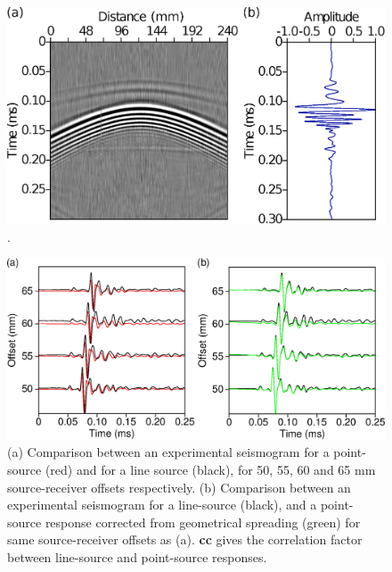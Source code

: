 \documentclass[manuscript,revised]{geophysics}
\begin{document}
\begin{figure}[!h]
	\centering
	\includegraphics[scale=0.4]{fig/amplitude_stack_principle.eps}
	\caption{.}
	\label{amplitude_stack_principle}
\end{figure}

\begin{figure}[!h]
	\centering
	\includegraphics[scale=0.5]{fig/panel_amp3d2d.eps}
	\caption{(a) Comparison between an experimental seismogram for a point-source (red) and for a line source (black), for 50, 55, 60 and 65 mm source-receiver offsets respectively. (b) Comparison between an experimental seismogram for a line-source (black), and a point-source response corrected from geometrical spreading (green) for same source-receiver offsets as (a). \textbf{cc} gives the correlation factor between line-source and point-source responses.}
	\label{panel_amplitude}
\end{figure}

%
\end{document}
